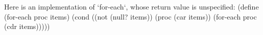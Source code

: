 Here is an implementation of `for-each`, whose return value is unspecified:
\begtt\scm
(define (for-each proc items)
  (cond ((not (null? items))
         (proc (car items))
         (for-each proc (cdr items)))))
\endtt
